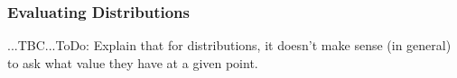 \subsubsection{Evaluating Distributions} ...TBC...ToDo: Explain that for distributions, it doesn't make sense (in general) to ask what value they have at a given point. 


%


